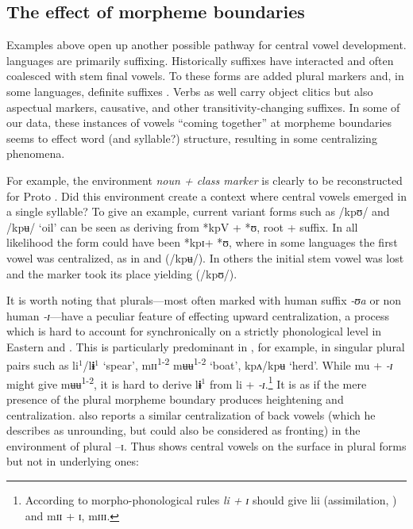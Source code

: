 \documentclass[output=paper,newtxmath,modfonts,nonflat]{langsci/langscibook}
\begin{document}
\subsection{The effect of morpheme boundaries}\label{sec:zogbo:4.3} 

Examples above open up another possible pathway for central vowel development.  languages are primarily suffixing.  Historically  suffixes have interacted and often coalesced with stem final vowels. To these forms are added plural markers and, in some languages, definite suffixes \citep{Marchese1979/1983,Zogbo2017}.  Verbs as well carry object clitics but also aspectual markers, causative, and other transitivity-changing suffixes. In some of our data, these instances of vowels “coming together” at morpheme boundaries seems to effect word (and syllable?) structure, resulting in some centralizing phenomena. 

For example, the environment \textit{noun + class marker} is clearly to be reconstructed for Proto .  Did this environment create a context where central vowels emerged in a single syllable?  To give an example, current variant forms such as /kpʊ/ and /kpʉ/ ‘oil’ can be seen as deriving from *kpV + *ʊ, root +  suffix. In all likelihood the form could have been *kpɪ+ *ʊ, where in some languages the first vowel was centralized, as in  and  (/kpʉ/). In others the initial stem vowel was lost and the  marker took its place yielding (/kpʊ/).

It is worth noting that  plurals—most often marked with human suffix \textit{{}-ʊa} or non human \textit{{}-ɪ}—have a peculiar feature of effecting upward centralization, a process which is hard to account for synchronically on a strictly phonological level in Eastern  and  \citep{Marchese1979/1983}. This is particularly predominant in , for example, in singular plural pairs such as li$^1$/l\textbf{ɨ}$^1$ ‘spear’, mɪɪ\textsuperscript{1-2} mʉʉ\textsuperscript{1-2} ‘boat’, kpʌ/kpʉ ‘herd’.  While mu + \textit{{}-ɪ} might give mʉʉ\textsuperscript{1-2}, it is hard to derive l\textbf{ɨ}$^1$ from li + \textit{{}-ɪ}.\footnote{According to morpho-phonological rules \textit{li + ɪ} should give lii (assimilation, ) and mɪɪ + ɪ, mɪɪɪ.} It is as if the mere presence of the plural morpheme boundary produces heightening and centralization. \citet{Goprou2014} also reports a similar centralization of back vowels (which he describes as unrounding, but could also be considered as fronting) in the environment of plural –ɪ. Thus  shows central vowels on the surface in plural forms but not in underlying ones:
\end{document}
